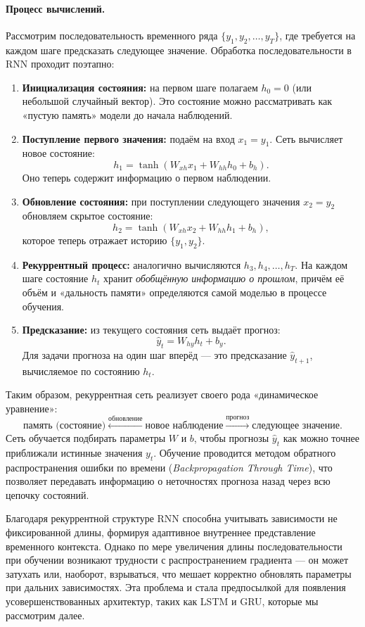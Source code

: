 \documentclass[12pt,a4paper]{article}
\begin{document}
\paragraph{Процесс вычислений.}
Рассмотрим последовательность временного ряда $\{y_1, y_2, \ldots, y_T\}$, где требуется на каждом шаге предсказать следующее значение.
Обработка последовательности в RNN проходит поэтапно:

\begin{enumerate}
    \item \textbf{Инициализация состояния:} на первом шаге полагаем $h_0 = 0$ (или небольшой случайный вектор). Это состояние можно рассматривать как «пустую память» модели до начала наблюдений.
    \item \textbf{Поступление первого значения:} подаём на вход $x_1 = y_1$. Сеть вычисляет новое состояние:
    \[
    h_1 = \tanh(W_{xh} x_1 + W_{hh} h_0 + b_h).
    \]
    Оно теперь содержит информацию о первом наблюдении.
    \item \textbf{Обновление состояния:} при поступлении следующего значения $x_2 = y_2$ обновляем скрытое состояние:
    \[
    h_2 = \tanh(W_{xh} x_2 + W_{hh} h_1 + b_h),
    \]
    которое теперь отражает историю $\{y_1, y_2\}$.
    \item \textbf{Рекуррентный процесс:} аналогично вычисляются $h_3, h_4, \ldots, h_T$. На каждом шаге состояние $h_t$ хранит \emph{обобщённую информацию о прошлом}, причём её объём и «дальность памяти» определяются самой моделью в процессе обучения.
    \item \textbf{Предсказание:} из текущего состояния сеть выдаёт прогноз:
    \[
    \hat{y}_t = W_{hy} h_t + b_y.
    \]
    Для задачи прогноза на один шаг вперёд — это предсказание $\hat{y}_{t+1}$, вычисляемое по состоянию $h_t$.
\end{enumerate}

Таким образом, рекуррентная сеть реализует своего рода «динамическое уравнение»:
\[
\text{память (состояние)} \xleftarrow{\text{обновление}} \text{новое наблюдение} \xrightarrow{\text{прогноз}} \text{следующее значение}.
\]
Сеть обучается подбирать параметры $W$ и $b$, чтобы прогнозы $\hat{y}_t$ как можно точнее приближали истинные значения $y_t$. Обучение проводится методом обратного распространения ошибки по времени (\textit{Backpropagation Through Time}), что позволяет передавать информацию о неточностях прогноза назад через всю цепочку состояний.

Благодаря рекуррентной структуре RNN способна учитывать зависимости не фиксированной длины, формируя адаптивное внутреннее представление временного контекста. Однако по мере увеличения длины последовательности при обучении возникают трудности с распространением градиента — он может затухать или, наоборот, взрываться, что мешает корректно обновлять параметры при дальних зависимостях. Эта проблема и стала предпосылкой для появления усовершенствованных архитектур, таких как LSTM и GRU, которые мы рассмотрим далее.
\end{document}
